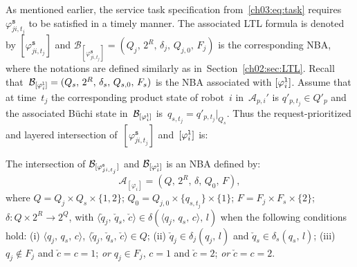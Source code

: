 As mentioned earlier, the service task specification from~\eqref{ch03:eq:task} requires~$\varphi_{ji,t_j}^\texttt{s}$ to be satisfied in a timely manner. The associated LTL formula is denoted by $[\varphi_{ji,t_j}^\texttt{s}]$ and $\mathcal{B}_{[\varphi_{ji,t_j}^\texttt{s}]}=(Q_j, \,2^{R},\, \delta_j,\, Q_{j,0},\, F_j)$ is the corresponding NBA, where the notations are defined similarly as in~Section~\ref{ch02:sec:LTL}.
Recall that~$\mathcal{B}_{[\varphi_i^{\textup{\texttt{l}}}]}=(Q_s, \,2^{R},\, \delta_s,\, Q_{s,0},\, F_s)$ is the NBA associated with $[\varphi_i^{\textup{\texttt{l}}}]$.
Assume that at time~$t_j$ the corresponding product state of robot~$i$ in~$\mathcal{A}_{p,i}'$ is $q'_{p,t_j}\in Q'_p$ and the associated B\"uchi state in~$\mathcal{B}_{[\varphi_i^{\textup{\texttt{l}}}]}$ is~$q_{s,t_j}=q'_{p,t_j}|_{Q_s}$.
Thus the request-prioritized and layered intersection of~$[\varphi_{ji,t_j}^{\texttt{s}}]$ and~$[\varphi_i^{\textup{\texttt{l}}}]$ is:
\begin{definition}\label{ch03:def:intersect}
The intersection of $\mathcal{B}_{[\varphi_{ji,t_j}^{\textup{\texttt{s}}}]}$ and $\mathcal{B}_{[\varphi_i^{\textup{\texttt{l}}}]}$ is an NBA defined by:
\begin{equation}\label{ch03:eq:newintersect}
{\mathcal{A}}_{[\varphi_i]}=(Q,\, 2^{R},\, \delta, \, Q_0,\, F),
\end{equation}
where $Q=Q_{j} \times Q_s  \times \{1,2\}$; $Q_{0}=Q_{j,0} \times \{q_{s,t_j}\} \times \{1\}$; $F=F_{j}\times F_{s}\times \{2\}$;   $\delta: Q \times 2^{R} \rightarrow 2^Q$, with $\langle \check{q}_j,\,\check{q}_s, \,\check{c}\rangle \in \delta(\langle {q}_j,\,{q}_s, \,{c}\rangle, \,l)$ when the following conditions hold:
(i) $\langle {q}_j,\,{q}_s, \,{c}\rangle$, $\langle \check{q}_j,\,\check{q}_s, \,\check{c}\rangle \in Q$;
(ii) $\check{q}_j\in \delta_j(q_j,\,l)$ and  $\check{q}_s\in \delta_s(q_s,\,l)$;
(iii) $q_{j}\notin F_{j}$ and $\check{c}=c=1 $; \emph{or} $q_{j}\in F_{j}$, $c=1$ and $\check{c} =2$; \emph{or} $\check{c}=c=2$.

\end{definition}

